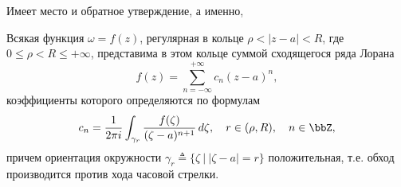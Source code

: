 Имеет место и обратное утверждение, а именно, 

\begin{thm} \label{ch35.1Thm1}
Всякая функция $\omega = f(z)$, регулярная в кольце $\rho < |z - a| < R$, где $0 \le \rho < R \le +\infty$, представима в этом кольце суммой сходящегося ряда Лорана
$$
f(z) = \sum\limits_{n = -\infty}^{+\infty} c_n(z - a)^n,
$$
коэффициенты которого определяются по формулам
\begin{equation} \label{ch35.1eq4}
c_n = \frac{1}{2\pi i} \int_{\gamma_r} \frac{f(\zeta)}{(\zeta - a)^{n + 1}} \,d\zeta, \quad r \in (\rho, R), \quad n \in \bbZ,
\end{equation}
причем ориентация окружности $\gamma_r \triangleq \{\zeta \: \big| \: |\zeta - a| = r\}$ положительная, т.е. обход производится против хода часовой стрелки.

\end{thm}

